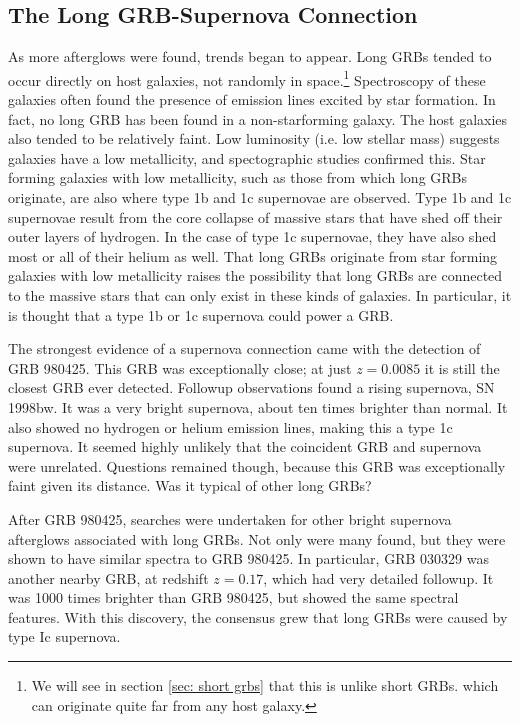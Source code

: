 \documentclass[11pt]{cuthesis}
\begin{document}
\subsection{The Long GRB-Supernova Connection}
As more afterglows were found, trends began to appear. Long GRBs tended to occur directly on host galaxies, not randomly in space.\footnote{We will see in section \ref{sec: short grbs} that this is unlike short GRBs. which can originate quite far from any host galaxy.} Spectroscopy of these galaxies often found the presence of emission lines excited by star formation. In fact, no long GRB has been found in a non-starforming galaxy. The host galaxies also tended to be relatively faint. Low luminosity (i.e. low stellar mass) suggests galaxies have a low metallicity\cite{Lamareille:2004ja}, and spectographic studies confirmed this. Star forming galaxies with low metallicity, such as those from which long GRBs originate, are also where type 1b and 1c supernovae are observed. Type 1b and 1c supernovae result from the core collapse of massive stars that have shed off their outer layers of hydrogen.\cite{sn_review} In the case of type 1c supernovae, they have also shed most or all of their helium as well. That long GRBs originate from star forming galaxies with low metallicity raises the possibility that long GRBs are connected to the massive stars that can only exist in these kinds of galaxies. In particular, it is thought that a type 1b or 1c supernova could power a GRB.

The strongest evidence of a supernova connection came with the detection of GRB 980425. This GRB was exceptionally close; at just $z=0.0085$ it is still the closest GRB ever detected. Followup observations found a rising supernova, SN 1998bw. It was a very bright supernova, about ten times brighter than normal. It also showed no hydrogen or helium emission lines, making this a type 1c supernova. It seemed highly unlikely that the coincident GRB and supernova were unrelated. Questions remained though, because this GRB was exceptionally faint given its distance. Was it typical of other long GRBs? 

After GRB 980425, searches were undertaken for other bright supernova afterglows associated with long GRBs. Not only were many found, but they were shown to have similar spectra to GRB 980425. In particular, GRB 030329 was another nearby GRB, at redshift $z=0.17$, which had very detailed followup. It was 1000 times brighter than GRB 980425, but showed the same spectral features. With this discovery, the consensus grew that long GRBs were caused by type Ic supernova.
\end{document}
